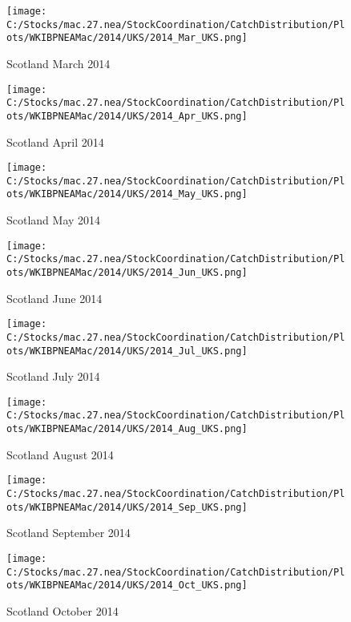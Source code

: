 \documentclass{article}
\begin{document}
\begin{figure}
	\centering
		\texttt{[image: C:/Stocks/mac.27.nea/StockCoordination/CatchDistribution/Plots/WKIBPNEAMac/2014/UKS/2014\_Mar\_UKS.png]}
	\caption{Scotland March 2014}
	\label{fig:2014_Mar_UKS}
\end{figure}

\begin{figure}
	\centering
		\texttt{[image: C:/Stocks/mac.27.nea/StockCoordination/CatchDistribution/Plots/WKIBPNEAMac/2014/UKS/2014\_Apr\_UKS.png]}
	\caption{Scotland April 2014}
	\label{fig:2014_Apr_UKS}
\end{figure}

\begin{figure}
	\centering
		\texttt{[image: C:/Stocks/mac.27.nea/StockCoordination/CatchDistribution/Plots/WKIBPNEAMac/2014/UKS/2014\_May\_UKS.png]}
	\caption{Scotland May 2014}
	\label{fig:2014_May_UKS}
\end{figure}

\begin{figure}
	\centering
		\texttt{[image: C:/Stocks/mac.27.nea/StockCoordination/CatchDistribution/Plots/WKIBPNEAMac/2014/UKS/2014\_Jun\_UKS.png]}
	\caption{Scotland June 2014}
	\label{fig:2014_Jun_UKS}
\end{figure}

\begin{figure}
	\centering
		\texttt{[image: C:/Stocks/mac.27.nea/StockCoordination/CatchDistribution/Plots/WKIBPNEAMac/2014/UKS/2014\_Jul\_UKS.png]}
	\caption{Scotland July 2014}
	\label{fig:2014_Jul_UKS}
\end{figure}

\begin{figure}
	\centering
		\texttt{[image: C:/Stocks/mac.27.nea/StockCoordination/CatchDistribution/Plots/WKIBPNEAMac/2014/UKS/2014\_Aug\_UKS.png]}
	\caption{Scotland August 2014}
	\label{fig:2014_Aug_UKS}
\end{figure}

\begin{figure}
	\centering
		\texttt{[image: C:/Stocks/mac.27.nea/StockCoordination/CatchDistribution/Plots/WKIBPNEAMac/2014/UKS/2014\_Sep\_UKS.png]}
	\caption{Scotland September 2014}
	\label{fig:2014_Sep_UKS}
\end{figure}

\begin{figure}
	\centering
		\texttt{[image: C:/Stocks/mac.27.nea/StockCoordination/CatchDistribution/Plots/WKIBPNEAMac/2014/UKS/2014\_Oct\_UKS.png]}
	\caption{Scotland October 2014}
	\label{fig:2014_Oct_UKS}
\end{figure}
\end{document}

